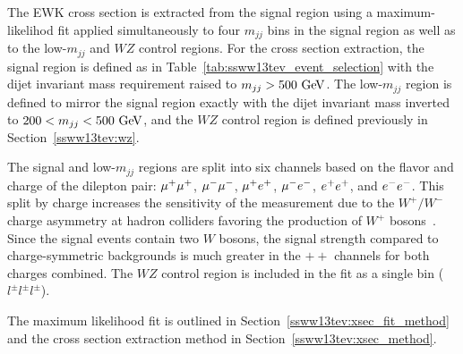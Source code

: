The \ssww EWK cross section is extracted from the signal region using a maximum-likelihod fit applied simultaneously to four $m_{jj}$ bins in the signal region as well as to the low-$m_{jj}$ and $WZ$ control regions.
For the cross section extraction, the signal region is defined as in Table~\ref{tab:ssww13tev_event_selection} with the dijet invariant mass requirement raised to $m_{jj} > 500\gev$.
The low-$m_{jj}$ region is defined to mirror the signal region exactly with the dijet invariant mass inverted to $200 < m_{jj} < 500\gev$, and the $WZ$ control region is defined previously in Section~\ref{ssww13tev:wz}.

The signal and low-$m_{jj}$ regions are split into six channels based on the flavor and charge of the dilepton pair: $\mu^{+}\mu^{+}$, $\mu^{-}\mu^{-}$, $\mu^{+}e^{+}$, $\mu^{-}e^{-}$, $e^{+}e^{+}$, and $e^{-}e^{-}$.
This split by charge increases the sensitivity of the measurement due to the $W^{+}/W^{-}$ charge asymmetry at hadron colliders favoring the production of $W^{+}$ bosons~\cite{2010.w-charge-asymmetry}.
Since the signal events contain two $W$ bosons, the signal strength compared to charge-symmetric backgrounds is much greater in the $++$ channels for both charges combined.
The $WZ$ control region is included in the fit as a single bin ($l^{\pm}l^{\pm}l^{\pm}$).

The maximum likelihood fit is outlined in Section~\ref{ssww13tev:xsec_fit_method} and the cross section extraction method in Section~\ref{ssww13tev:xsec_method}.

